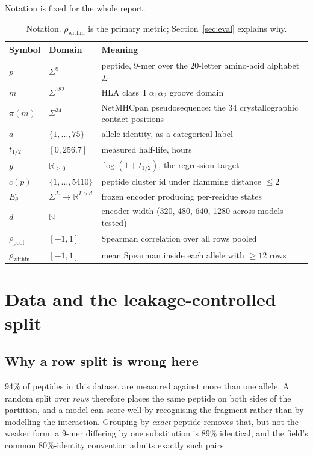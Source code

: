 \documentclass[11pt,a4paper]{article}
\newcommand{\rhop}{\rho_{\text{pool}}}
\newcommand{\rhow}{\rho_{\text{within}}}
\begin{document}
Notation is fixed for the whole report.

\begin{table}[H]
\centering\small
\begin{tabular}{@{}llp{86mm}@{}}
\toprule
\textbf{Symbol} & \textbf{Domain} & \textbf{Meaning} \\
\midrule
$p$ & $\Sigma^{9}$ & peptide, 9-mer over the 20-letter amino-acid alphabet $\Sigma$ \\
$m$ & $\Sigma^{182}$ & HLA class~I $\alpha_1\alpha_2$ groove domain \\
$\pi(m)$ & $\Sigma^{34}$ & NetMHCpan pseudosequence: the 34 crystallographic contact positions \\
$a$ & $\{1,\dots,75\}$ & allele identity, as a categorical label \\
$t_{1/2}$ & $[0,256.7]$ & measured half-life, hours \\
$y$ & $\mathbb{R}_{\ge 0}$ & $\log(1+t_{1/2})$, the regression target \\
$c(p)$ & $\{1,\dots,5410\}$ & peptide cluster id under Hamming distance $\le 2$ \\
$E_\theta$ & $\Sigma^{L}\!\to\!\mathbb{R}^{L\times d}$ & frozen encoder producing per-residue states \\
$d$ & $\mathbb{N}$ & encoder width (320, 480, 640, 1280 across models tested) \\
$\rhop$ & $[-1,1]$ & Spearman correlation over all rows pooled \\
$\rhow$ & $[-1,1]$ & mean Spearman inside each allele with $\ge 12$ rows \\
\bottomrule
\end{tabular}
\caption{Notation. $\rhow$ is the primary metric; Section~\ref{sec:eval} explains why.}
\end{table}

\section{Data and the leakage-controlled split}

\subsection{Why a row split is wrong here}

94\% of peptides in this dataset are measured against more than one allele. A random split over
\emph{rows} therefore places the same peptide on both sides of the partition, and a model can
score well by recognising the fragment rather than by modelling the interaction. Grouping by
\emph{exact} peptide removes that, but not the weaker form: a 9-mer differing by one substitution
is 89\% identical, and the field's common 80\%-identity convention admits exactly such pairs.
\end{document}

